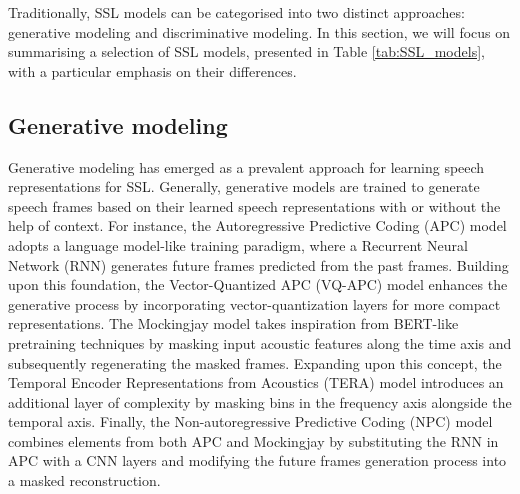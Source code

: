 Traditionally, SSL models can be categorised into two distinct approaches: generative modeling and discriminative modeling. In this section, we will focus on summarising a selection of SSL models, presented in Table \ref{tab:SSL_models}, with a particular emphasis on their differences.

\subsection{Generative modeling}
Generative modeling has emerged as a prevalent approach for learning speech representations for SSL. Generally, generative models are trained to generate speech frames based on their learned speech representations with or without the help of context. For instance, the Autoregressive Predictive Coding (APC) model adopts a language model-like training paradigm, where a Recurrent Neural Network (RNN) generates future frames predicted from the past frames. Building upon this foundation, the Vector-Quantized APC (VQ-APC) model enhances the generative process by incorporating vector-quantization layers for more compact representations.
The Mockingjay model takes inspiration from BERT-like pretraining techniques by masking input acoustic features along the time axis and subsequently regenerating the masked frames. Expanding upon this concept, the Temporal Encoder Representations from Acoustics (TERA) model introduces an additional layer of complexity by masking bins in the frequency axis alongside the temporal axis. Finally, the Non-autoregressive Predictive Coding (NPC) model combines elements from both APC and Mockingjay by substituting the RNN in APC with a CNN layers and modifying the future frames generation process into a masked reconstruction.

